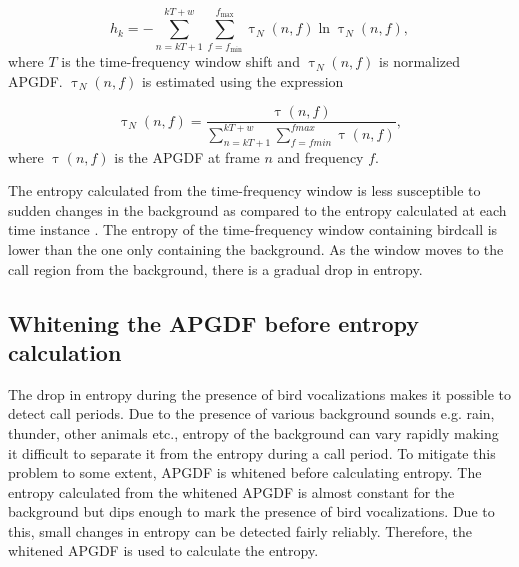 \documentclass[a4paper]{article}
\begin{document}
\begin{equation}
\label{eq:2}
 h_{k}=-\sum_{n=kT+1}^{kT+w}\sum_{f=f_{\min}}^{f_{\max}} \uptau_N(n,f) \ln \uptau_N(n,f),
\end{equation}
where $T$ is the time-frequency window shift and $\uptau_N(n,f)$ is normalized
APGDF. $\uptau_N(n,f)$ is estimated using the expression 


    
\begin{equation}
\label{eq:3}
\uptau_N(n,f)=\frac {\uptau(n,f)}
{\sum_{n=kT+1}^{kT+w}\sum_{f=fmin}^{fmax} \uptau(n,f)},
\end{equation}
where $\uptau(n,f)$ is the APGDF at frame $n$ and frequency $f$.

The entropy calculated from the time-frequency window is less susceptible to sudden
changes in the background as compared to the entropy calculated at each time
instance \cite{wang2013}. The entropy of the time-frequency window containing
birdcall is lower than the one only containing the background. As the
window moves to the call region from the background, there is a gradual drop in
entropy. 




 


\subsection{Whitening the APGDF before entropy calculation}

The drop in entropy during the presence of bird vocalizations makes it possible
to detect call periods. Due to the presence of various background sounds e.g.
rain, thunder, other animals etc., entropy of the background can  vary rapidly
making it difficult to separate it from the entropy during a call period. To
mitigate this problem to some extent, APGDF is whitened  before calculating
entropy. The entropy calculated from the whitened APGDF is almost constant for
the background but dips enough to mark the presence of bird vocalizations. Due
to this, small changes in entropy can be detected fairly reliably. Therefore, the whitened APGDF is used to calculate the entropy.
\end{document}
